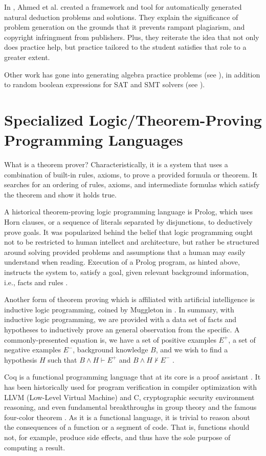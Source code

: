 \documentclass[ms]{uncgdissertationexp2}
\theoremstyle{plain}
\theoremstyle{definition}
\theoremstyle{remark}
\begin{document}
In \cite{ahmed}, Ahmed et al. created a framework and tool for automatically generated natural deduction problems and solutions. They explain the significance of problem generation on the grounds that it prevents rampant plagiarism, and copyright infringment from publishers. Plus, they reiterate the idea that not only does practice help, but practice tailored to the student satisfies that role to a greater extent.

Other work has gone into generating algebra practice problems (see \cite{singh}), in addition to random boolean expressions for SAT and SMT solvers (see \cite{amendola}).

\section{Specialized Logic/Theorem-Proving Programming Languages}
What is a theorem prover? Characteristically, it is a system that uses a combination of built-in rules, axioms, to prove a provided formula or theorem. It searches for an ordering of rules, axioms, and intermediate formulas which satisfy the theorem and show it holds true. 

A historical theorem-proving logic programming language is Prolog, which uses Horn clauses, or a sequence of literals separated by disjunctions, to deductively prove goals. It was popularized behind the belief that logic programming ought not to be restricted to human intellect and architecture, but rather be structured around solving provided problems and assumptions that a human may easily understand when reading. Execution of a Prolog program, as hinted above, instructs the system to, satisfy a goal, given relevant background information, i.e., facts and rules \cite{theartofprolog}.

Another form of theorem proving which is affiliated with artificial intelligence is inductive logic programming, coined by Muggleton in \cite{muggleton}. In summary, with inductive logic programming, we are provided with a data set of facts and hypotheses to inductively prove an general observation from the specific. A commonly-presented equation is, we have a set of positive examples $E^+$, a set of negative examples $E^-$, background knowledge $B$, and we wish to find a hypothesis $H$ such that $B \land H \vdash E^+$ and $B \land H \nvdash E^-$ \cite{bratko}.

Coq is a functional programming language that at its core is a proof assistant \cite{softwarefoundations}. It has been historically used for program verification in compiler optimization with LLVM (Low-Level Virtual Machine) and C, cryptographic security environment reasoning, and even fundamental breakthroughs in group theory and the famous four-color theorem \cite{fourcolortheorem}. As it is a functional language, it is trivial to reason about the consequences of a function or a segment of code. That is, functions should not, for example, produce side effects, and thus have the sole purpose of computing a result.
\end{document}
